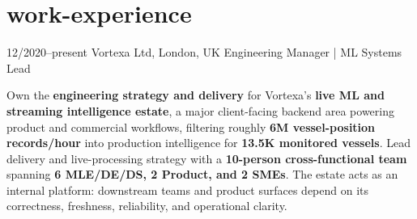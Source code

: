 \documentclass[]{../../friggeri-cv}
\begin{document}
\section{work-experience}
\begin{entrylist}
    \entry
    {12/2020--present}
    {Vortexa Ltd, London, UK}
    {Engineering Manager | ML Systems Lead}
    {
        {\small
        \setlength{\parindent}{0pt}
        \setlength{\leftskip}{0pt}
        Own the \textbf{engineering strategy and delivery} for Vortexa's \textbf{live ML and streaming intelligence estate}, a major client-facing backend area powering product and commercial workflows, filtering roughly \textbf{6M vessel-position records/hour} into production intelligence for \textbf{13.5K monitored vessels}. Lead delivery and live-processing strategy with a \textbf{10-person cross-functional team} spanning \textbf{6 MLE/DE/DS, 2 Product, and 2 SMEs}. The estate acts as an internal platform: downstream teams and product surfaces depend on its correctness, freshness, reliability, and operational clarity.

}}
\end{entrylist}
\end{document}
